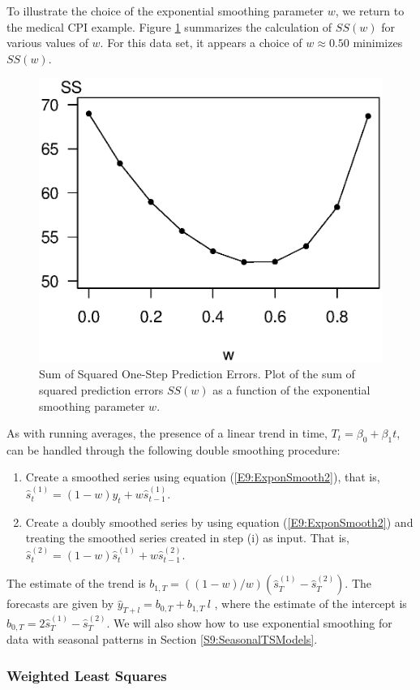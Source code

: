 To illustrate the choice of the exponential smoothing parameter $w$,
we return to the medical CPI example. Figure \ref{F9:SSPE}
summarizes the calculation of $SS\left( w\right) $ for various
values of $w$. For this data set, it appears a choice of $w \approx
0.50$ minimizes $SS(w)$.


\begin{figure}[htp]
  \begin{center}
    \includegraphics[width=.3\textwidth]
     {Chapter9Forecasting/SSPE.eps}
    \caption{\label{F9:SSPE} \small Sum of Squared One-Step Prediction Errors. Plot of the sum of squared prediction errors
$SS(w)$ as a function of the exponential smoothing parameter $w$.}
  \end{center}
\end{figure}


As with running averages, the presence of a linear trend in time,
$T_t = \beta_0 + \beta_1 t$, can be handled through the following
double smoothing procedure:

\begin{enumerate}
\item Create a smoothed series using equation (\ref{E9:ExponSmooth2}), that is,
$\widehat{s}_t^{(1)} = (1-w) y_t + w \widehat{s}_{t-1}^{(1)}.$

\item Create a doubly smoothed series by using equation (\ref{E9:ExponSmooth2})
and treating the smoothed series created in step (i) as input. That
is, $\widehat{s}_t^{(2)} = (1-w) \widehat{s}_t^{(1)} +
w\widehat{s}_{t-1}^{(2)}$.
\end{enumerate}

\noindent The estimate of the trend is $b_{1,T} =
((1-w)/w)(\widehat{s}_T^{(1)}- \widehat{s}_T^{(2)})$. The forecasts
are given by $\widehat{y}_{T+l}= b_{0,T}+b_{1,T}~l$ , where the
estimate of the intercept is $ b_{0,T} = 2\widehat{s}_T^{(1)} -
\widehat{s}_T^{(2)}$. We will also show how to use exponential
smoothing for data with seasonal patterns in Section
\ref{S9:SeasonalTSModels}.

\subsubsection*{Weighted Least Squares}

